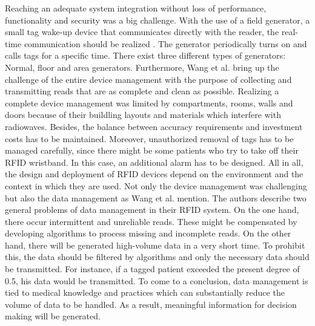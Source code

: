Reaching an adequate system integration without loss of performance, functionality and security was a big challenge. With the use of a field generator, a small tag wake-up device that communicates directly with the reader, the real-time communication should be realized \cite[p.4]{casestudy}. The generator periodically turns on and calls tags for a specific time. There exist three different types of generators: Normal, floor and area generators.
Furthermore, Wang et al. bring up the challenge of the entire device management \cite[p.5]{casestudy} with the purpose of collecting and transmitting reads that are as complete and clean as possible. Realizing a complete device management was limited by compartments, rooms, walls and doors because of their buildling layouts and materials which interfere with radiowaves. Besides, the balance between accuracy requirements and investment costs has to be maintained. Moreover, unauthorized removal of tags has to be managed carefully, since there might be some patients who try to take off their RFID wristband. In this case, an additional alarm has to be designed. All in all, the design and deployment of RFID devices depend on the environment and the context in which they are used. 
Not only the device management was challenging but also the data management as Wang et al. mention. The authors describe two general problems of data management in their RFID system. On the one hand, there occur intermittent and unreliable reads. These might be compensated by developing algorithms to process missing and incomplete reads. On the other hand, there will be generated high-volume data in a very short time. To prohibit this, the data should be filtered by algorithms and only the necessary data should be transmitted. For instance, if a tagged patient exceeded the present degree of 0.5\celsius, his data would be transmitted. To come to a conclusion, data management is tied to medical knowledge and practices which can substantially reduce the volume of data to be handled. As a result, meaningful information for decision making will be generated.
 
